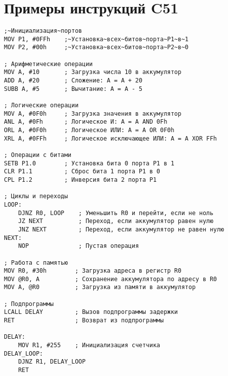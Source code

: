 \documentclass{article}
\begin{document}
\section{Примеры инструкций C51}

\begin{lstlisting}
;~Инициализация~портов
MOV P1, #0FFh    ;~Установка~всех~битов~порта~P1~в~1
MOV P2, #00h     ;~Установка~всех~битов~порта~P2~в~0

; Арифметические операции
MOV A, #10       ; Загрузка числа 10 в аккумулятор
ADD A, #20       ; Сложение: A = A + 20
SUBB A, #5       ; Вычитание: A = A - 5

; Логические операции
MOV A, #0F0h     ; Загрузка значения в аккумулятор
ANL A, #0Fh      ; Логическое И: A = A AND 0Fh
ORL A, #0F0h     ; Логическое ИЛИ: A = A OR 0F0h
XRL A, #0FFh     ; Логическое исключающее ИЛИ: A = A XOR FFh
 
; Операции с битами
SETB P1.0        ; Установка бита 0 порта P1 в 1
CLR P1.1         ; Сброс бита 1 порта P1 в 0
CPL P1.2         ; Инверсия бита 2 порта P1

; Циклы и переходы
LOOP:
    DJNZ R0, LOOP    ; Уменьшить R0 и перейти, если не ноль
    JZ NEXT          ; Переход, если аккумулятор равен нулю
    JNZ NEXT         ; Переход, если аккумулятор не равен нулю
NEXT:
    NOP              ; Пустая операция

; Работа с памятью
MOV R0, #30h        ; Загрузка адреса в регистр R0
MOV @R0, A          ; Сохранение аккумулятора по адресу в R0
MOV A, @R0          ; Загрузка из памяти в аккумулятор

; Подпрограммы
LCALL DELAY         ; Вызов подпрограммы задержки
RET                 ; Возврат из подпрограммы

DELAY:
    MOV R1, #255    ; Инициализация счетчика
DELAY_LOOP:
    DJNZ R1, DELAY_LOOP
    RET
\end{lstlisting}
\end{document}
